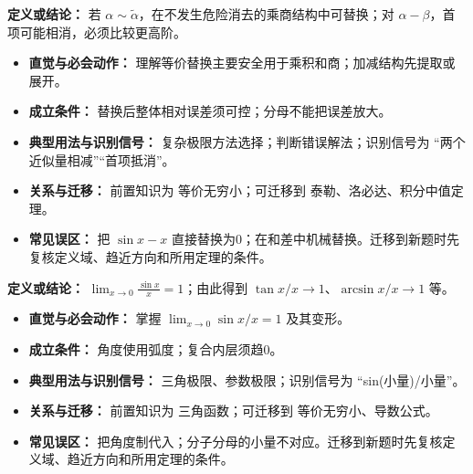 \begin{knowledgeBox}
\textbf{定义或结论：} 若 $\alpha\sim\tilde\alpha$，在不发生危险消去的乘商结构中可替换；对 $\alpha-\beta$，首项可能相消，必须比较更高阶。

\begin{itemize}
  \item \textbf{直觉与必会动作：} 理解等价替换主要安全用于乘积和商；加减结构先提取或展开。
  \item \textbf{成立条件：} 替换后整体相对误差须可控；分母不能把误差放大。
  \item \textbf{典型用法与识别信号：} 复杂极限方法选择；判断错误解法；识别信号为 “两个近似量相减”“首项抵消”。
  \item \textbf{关系与迁移：} 前置知识为 等价无穷小；可迁移到 泰勒、洛必达、积分中值定理。
  \item \textbf{常见误区：} 把 $\sin x-x$ 直接替换为0；在和差中机械替换。迁移到新题时先复核定义域、趋近方向和所用定理的条件。
\end{itemize}
\end{knowledgeBox}

\begin{knowledgeBox}
\textbf{定义或结论：} $\lim_{x\to0}\frac{\sin x}{x}=1$；由此得到 $\tan x/x\to1$、$\arcsin x/x\to1$ 等。

\begin{itemize}
  \item \textbf{直觉与必会动作：} 掌握 $\lim_{x\to0}\sin x/x=1$ 及其变形。
  \item \textbf{成立条件：} 角度使用弧度；复合内层须趋0。
  \item \textbf{典型用法与识别信号：} 三角极限、参数极限；识别信号为 “sin(小量)/小量”。
  \item \textbf{关系与迁移：} 前置知识为 三角函数；可迁移到 等价无穷小、导数公式。
  \item \textbf{常见误区：} 把角度制代入；分子分母的小量不对应。迁移到新题时先复核定义域、趋近方向和所用定理的条件。
\end{itemize}
\end{knowledgeBox}

